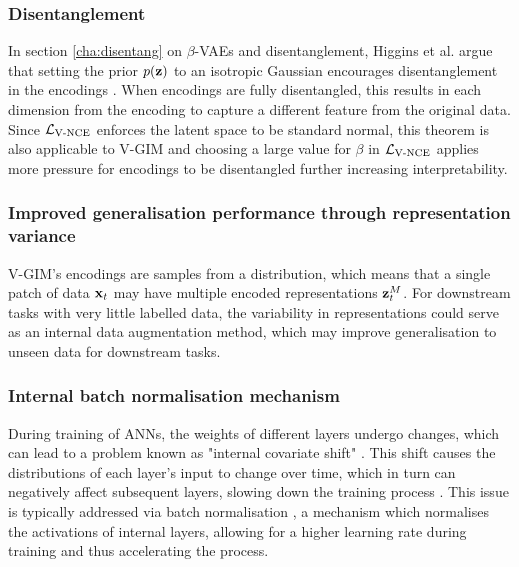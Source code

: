 						
	\subsubsection{Disentanglement}
		In section \ref{cha:disentang} on $\beta$-VAEs and disentanglement, Higgins et al. argue that setting the prior $p(\mathbf{z})$ to an isotropic Gaussian encourages disentanglement in the encodings \citep{higginsBetaVAELearningBasic2022}. When encodings are fully disentangled, this results in each dimension from the encoding to capture a different feature from the original data. Since $\mathcal{L}_{\text{V-NCE}}$ enforces the latent space to be standard normal, this theorem is also applicable to V-GIM and choosing a large value for $\beta$ in $\mathcal{L}_{\text{V-NCE}}$ applies more pressure for encodings to be disentangled further increasing interpretability.
		
	
	\subsubsection{Improved generalisation performance through representation variance}
		V-GIM's encodings are samples from a distribution, which means that a single patch of data $\mathbf{x}_t$ may have multiple encoded representations $\mathbf{z}_t^M$. For downstream tasks with very little labelled data, the variability in representations could serve as an internal data augmentation method, which may improve generalisation to unseen data for downstream tasks.
		

	
	\subsubsection{Internal batch normalisation mechanism} \label{cha:vgim_batch_norm}
		During training of ANNs, the weights of different layers undergo changes, which can lead to a problem known as "internal covariate shift" \citep{ioffeBatchNormalizationAccelerating2015}. This shift causes the distributions of each layer's input to change over time, which in turn can negatively affect subsequent layers, slowing down the training process \citep{bjorckUnderstandingBatchNormalization2018, lecunEfficientBackProp1998}. This issue is typically addressed via batch normalisation \citep{santurkarHowDoesBatch2018, bjorckUnderstandingBatchNormalization2018}, a mechanism which normalises the activations of internal layers, allowing for a higher learning rate during training and thus accelerating the process.
			
